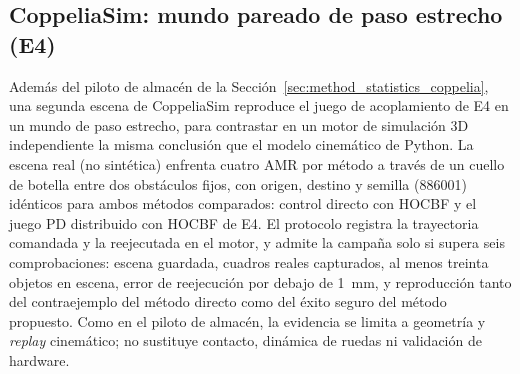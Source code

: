 \subsection{CoppeliaSim: mundo pareado de paso estrecho (E4)}
\label{sec:method-coppelia-narrow}

Además del piloto de almacén de la Sección~\ref{sec:method_statistics_coppelia},
una segunda escena de CoppeliaSim reproduce el juego de acoplamiento de E4 en
un mundo de paso estrecho, para contrastar en un motor de simulación 3D
independiente la misma conclusión que el modelo cinemático de Python. La
escena real (no sintética) enfrenta cuatro AMR por método a través de un
cuello de botella entre dos obstáculos fijos, con origen, destino y semilla
(886001) idénticos para ambos métodos comparados: control directo con HOCBF y
el juego PD distribuido con HOCBF de E4. El protocolo registra la trayectoria
comandada y la reejecutada en el motor, y admite la campaña solo si supera
seis comprobaciones: escena guardada, cuadros reales capturados, al menos
treinta objetos en escena, error de reejecución por debajo de 1~mm, y
reproducción tanto del contraejemplo del método directo como del éxito seguro
del método propuesto. Como en el piloto de almacén, la evidencia se limita a
geometría y \emph{replay} cinemático; no sustituye contacto, dinámica de
ruedas ni validación de hardware.
